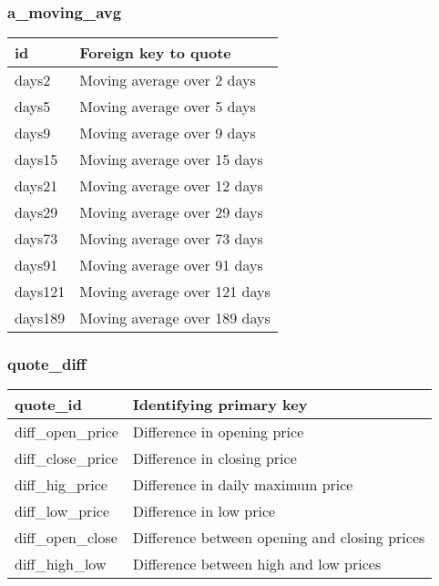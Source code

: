 \subsubsection{a\_moving\_avg}
\begin{tabular}{|l||l|}
	\hline
	id 				& Foreign key to quote \\ \hline
	days2			& Moving average over 2 days \\ \hline
	days5			& Moving average over 5 days \\ \hline
	days9			& Moving average over 9 days \\ \hline
	days15			& Moving average over 15 days \\ \hline
	days21			& Moving average over 12 days \\ \hline
	days29			& Moving average over 29 days \\ \hline
	days73			& Moving average over 73 days \\ \hline
	days91			& Moving average over 91 days \\ \hline
	days121			& Moving average over 121 days \\ \hline
	days189			& Moving average over 189 days \\ \hline
	\end{tabular}
\subsubsection{quote\_diff}
\begin{tabular}{|l||l|}
	\hline
	quote\_id 				& Identifying primary key \\ \hline
	diff\_open\_price		& Difference in opening price \\ \hline
	diff\_close\_price		& Difference in closing price \\ \hline
	diff\_hig\_price		& Difference in daily maximum price \\ \hline
	diff\_low\_price		& Difference in low price \\ \hline
	diff\_open\_close		& Difference between opening and closing prices\\ \hline
	diff\_high\_low			& Difference between high and low prices\\ \hline
\end{tabular}
